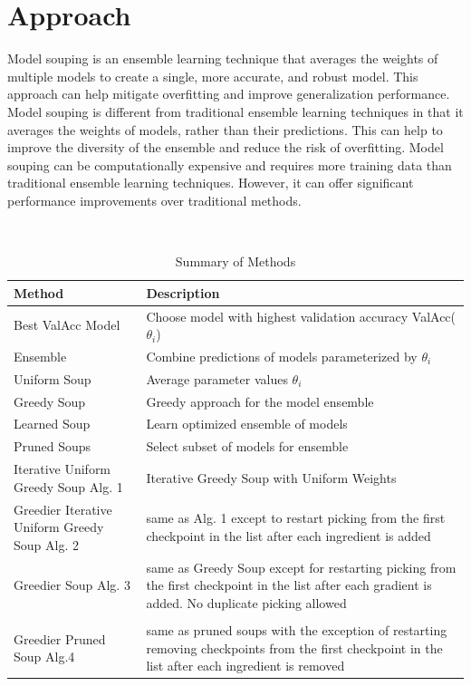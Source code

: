 \documentclass[10pt,twocolumn,letterpaper]{article}
\begin{document}
\section{ Approach }
Model souping \cite{wortsman2022model,dansereau2023model} is an ensemble learning technique that averages the weights of multiple models to create a single, more accurate, and robust model. This approach can help mitigate overfitting and improve generalization performance. Model souping is different from traditional ensemble learning techniques in that it averages the weights of models, rather than their predictions. This can help to improve the diversity of the ensemble and reduce the risk of overfitting. Model souping can be computationally expensive and requires more training data than traditional ensemble learning techniques. However, it can offer significant performance improvements over traditional methods.
\begin{table}[!htb]
\centering\
\small
\begin{tabular}{p{3.5cm} p{4cm}}
		\toprule
		\textbf{Method} & \textbf{Description} \\
		\midrule
		Best ValAcc Model & Choose model with highest validation accuracy ValAcc($\theta_i$) \\
		Ensemble & Combine predictions of models parameterized by $\theta_i$ \\
		Uniform Soup & Average parameter values $\theta_i$ \ \cite{wortsman2022model} \\
		Greedy Soup & Greedy approach for the model ensemble \cite{wortsman2022model}\\
		Learned Soup & Learn optimized ensemble of models \cite{wortsman2022model} \\
		Pruned Soups & Select subset of models for ensemble \cite{dansereau2023model} \\
		Iterative Uniform Greedy Soup Alg. 1 & Iterative Greedy Soup with Uniform Weights \\
        Greedier Iterative Uniform Greedy Soup Alg. 2 & same as Alg. 1 except to restart picking from the first checkpoint in the list after each ingredient is added \\
        Greedier Soup Alg. 3& same as Greedy Soup except for restarting picking from the first checkpoint in the list after each gradient is added. No duplicate picking allowed\\
        \\
        Greedier Pruned Soup Alg.4 & same as pruned soups with the exception of restarting removing checkpoints from the first checkpoint in the list after each ingredient is removed \\
		\bottomrule
	\end{tabular}
	\caption{Summary of Methods}
\end{table}
\end{document}
